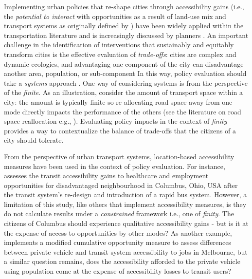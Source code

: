 \documentclass[numbered]{trbunofficial}
\begin{document}
Implementing urban policies that re-shape cities through accessibility
gains (i.e., the \emph{potential to interact} with opportunities as a
result of land-use mix and transport systems as originally defined by
\citet{hansenHowAccessibilityShapes1959}) have been widely applied
within the transportation literature and is increasingly discussed by
planners
\citep{levinsonTransportAccessManual2020, gowerPlanningInnovationCity2022, siddiqToolsTradeAssessing2021, yanAccessibilityBasedPlanningAddressing2021}.
An important challenge in the identification of interventions that
sustainably and equitably transform cities is the effective evaluation
of \emph{trade-offs}: cities are complex and dynamic ecologies, and
advantaging one component of the city can disadvantage another area,
population, or sub-component In this way, policy evaluation should take
a \emph{systems} approach
\citep{fikselSustainabilityResilienceSystems2006}. One way of
considering systems is from the perspective of the \emph{finite}. As an
illustration, consider the amount of transport space within a city: the
amount is typically finite so re-allocating road space away from one
mode directly impacts the performance of the others (see the literature
on road space reallocation e.g.,
\citet{valencaMainChallengesOpportunities2021}). Evaluating policy
impacts in the context of \emph{finity} provides a way to contextualize
the balance of trade-offs that the citizens of a city should tolerate.

From the perspective of urban transport systems, location-based
accessibility measures have been used in the context of policy
evaluation. For instance, \citet{leeMeasuringImpactsNew2018} assesses
the transit accessibility gains to healthcare and employment
opportunities for disadvantaged neighbourhood in Columbus, Ohio, USA
after the transit system's re-design and introduction of a rapid bus
system. However, a limitation of this study, like others that implement
accessibility measures, is they do not calculate results under a
\emph{constrained} framework i.e., one of \emph{finity}. The citizens of
Columbus should experience qualitative accessibility gains - but is it
at the expense of access to opportunities by other modes? As another
example, \citet{mohriClusteringMethodMeasuring2021} implements a
modified cumulative opportunity measure to assess differences between
private vehicle and transit system accessibility to jobs in Melbourne,
but a similar question remains, does the accessibility afforded to the
private vehicle using population come at the expense of accessibility
losses to transit users?
\end{document}
